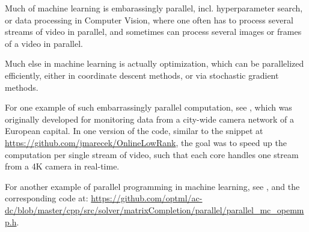 Much of machine learning is embarassingly parallel, 
incl. hyperparameter search, 
or data processing in Computer Vision, 
where one often has to process  
several streams of video in parallel, 
and sometimes can process several images or frames 
of a video in parallel.

Much else in machine learning is actually optimization,
which can be parallelized efficiently, 
either in coordinate descent methods,
or via stochastic gradient methods. 

For one example of such embarrassingly parallel computation, see 
\cite{akhriev2018pursuit}, which was originally developed 
for monitoring data from a city-wide camera network of a European capital. 
In one version of the code, similar to the snippet at  \url{https://github.com/jmarecek/OnlineLowRank},
the goal was to speed up the computation per single stream of video, such that each core handles one stream from a 4K camera in real-time. 

For another example of parallel programming in machine learning, see
\cite{marevcek2015distributed}, and the corresponding code at:
\url{https://github.com/optml/ac-dc/blob/master/cpp/src/solver/matrixCompletion/parallel/parallel_mc_opemmp.h}.

